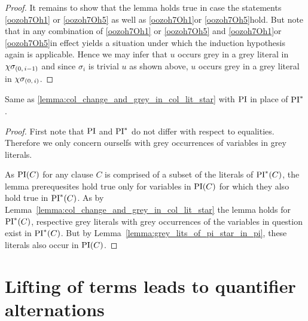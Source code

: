 \documentclass[,%
	draft=false,%
	numbers=noendperiod
	12pt,
	a4paper,
	oneside,%
	openany,
]{memoir}
\newcommand{\inv}{\ensuremath{\chi}}
\begin{document}
\begin{proof}
	It remains to show that the lemma holds true in case the statements \ref{oozoh7Oh1} or \ref{oozoh7Oh5} as well as \ref{oozoh7Oh1}\othercase or \ref{oozoh7Oh5}\othercase hold.
	But note that in any combination of \ref{oozoh7Oh1} or \ref{oozoh7Oh5} and \ref{oozoh7Oh1}\othercase or \ref{oozoh7Oh5}\othercase in effect yields a situation under which the induction hypothesis again is applicable.
	Hence we may infer that $u$ occurs grey in a grey literal in $\inv\sigmazmi$ and since $\sigma_i$ is trivial $u$ as shown above, $u$ occurs grey in a grey literal in $\inv\sigmazi$.
\end{proof}

\begin{lemma}
	\label{lemma:col_change_and_grey_in_col_lit}
	Same as \ref{lemma:col_change_and_grey_in_col_lit_star} with $\operatorname{PI}$ in place of $\operatorname{PI}^*$.
\end{lemma}
\begin{proof}
	First note that $\operatorname{PI}$ and $\operatorname{PI}^*$ do not differ with respect to equalities. Therefore we only concern ourselfs with grey occurrences of variables in grey literals.

	As $\operatorname{PI}(C)$ for any clause $C$ is comprised of a subset of the literals of $\operatorname{PI}^*(C)$, the lemma prerequesites hold true only for variables in $\operatorname{PI}(C)$ for which they also hold true in $\operatorname{PI}^*(C)$.
	As by Lemma~\ref{lemma:col_change_and_grey_in_col_lit_star} the lemma holds for $\operatorname{PI}^*(C)$, respective grey literals with grey occurrences of the variables in question exist in $\operatorname{PI}^*(C)$.
	But by Lemma~\ref{lemma:grey_lits_of_pi_star_in_pi}, these literals also occur in $\operatorname{PI}(C)$.
\end{proof}


\section{Lifting of terms leads to quantifier alternations}
\end{document}
